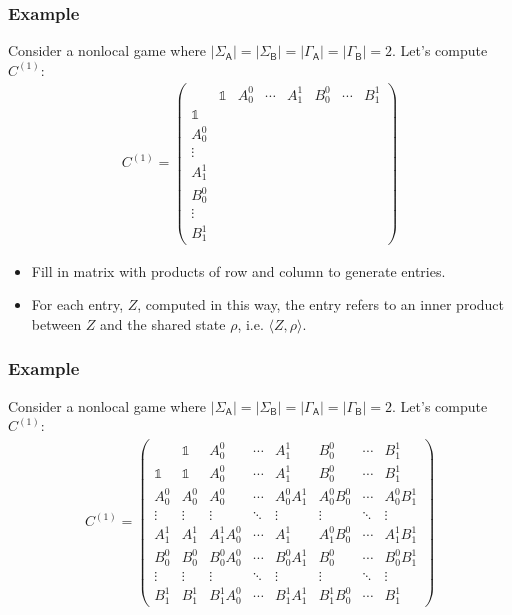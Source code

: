\documentclass{beamer}
\def\I{\mathds{1}}
\newcommand{\abs}[1]{\lvert #1 \rvert}
\newcommand{\ip}[2]{\langle #1 , #2\rangle}
\def \GammaA{\Gamma_{\reg{A}}}
\def \GammaB{\Gamma_{\reg{B}}}
\def \SigmaA{\Sigma_{\reg{A}}}
\def \SigmaB{\Sigma_{\reg{B}}}
\newcommand{\reg}[1]{\mathsf{#1}}
\begin{document}
\begin{frame}
	\frametitle{Example}
	Consider a nonlocal game where $\abs{\SigmaA} = \abs{\SigmaB} = \abs{\GammaA} = \abs{\GammaB} = 2$. Let's compute $C^{(1)}$:
	\[
\begin{aligned}
C^{(1)} =
\left(
\begin{array}{c||cccc|ccc}
 & \I & A_0^0 & \cdots & A_1^1 & B_0^0 & \cdots & B_1^1 \\
\hline\hline 
\I & & & & & & & \\
A_0^0 & & & & & & &  \\
\vdots & & & & & & & \\
A_1^1 & & & & & & & \\
\hline 
B_0^0 & & & & & & & \\
\vdots & & & & & & & \\
B_1^1 & & & & & & & 
\end{array}
\right) 
\end{aligned}
\]

\begin{itemize}
	\item Fill in matrix with products of row and column to generate entries. 
	\item For each entry, $Z$, computed in this way, the entry refers to an inner product between $Z$ and the shared state $\rho$, i.e. $\ip{Z}{\rho}$. 
\end{itemize}

\end{frame}

\begin{frame}
	\frametitle{Example}
	Consider a nonlocal game where $\abs{\SigmaA} = \abs{\SigmaB} = \abs{\GammaA} = \abs{\GammaB} = 2$. Let's compute $C^{(1)}$:
	\[
\begin{aligned}
C^{(1)} =
\left(
\begin{array}{c||cccc|ccc}
 & \I & A_0^0 & \cdots & A_1^1 & B_0^0 & \cdots & B_1^1 \\
\hline\hline 
\I & \I & A_0^0 & \cdots & A_1^1 & B_0^0 & \cdots & B_1^1 \\
A_0^0 & A_0^0 & A_0^0 & \cdots & A_0^0 A_1^1 & A_0^0 B_0^0 & \cdots & A_0^0 B_1^1 \\
\vdots & \vdots & \vdots & \ddots & \vdots & \vdots  & \ddots & \vdots \\
A_1^1 & A_1^1 & A_1^1 A_0^0 & \cdots & A_1^1 & A_1^0 B_0^0 & \cdots & A_1^1 B_1^1 \\
\hline 
B_0^0 & B_0^0 & B_0^0 A_0^0 & \cdots & B_0^0 A_1^1 & B_0^0 & \cdots & B_0^0 B_1^1 \\
\vdots & \vdots & \vdots & \ddots & \vdots & \vdots  & \ddots & \vdots \\
B_1^1 & B_1^1 & B_1^1 A_0^0 & \cdots & B_1^1 A_1^1 & B_1^1 B_0^0 & \cdots & B_1^1
\end{array}
\right) 
\end{aligned}
\]
\end{frame}
\end{document}
